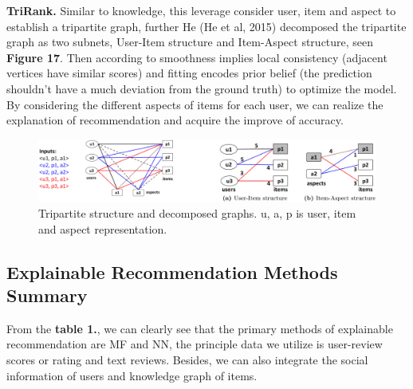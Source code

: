 \documentclass[10pt,twocolumn,letterpaper]{article}
\begin{document}
{\bf TriRank.} Similar to knowledge, this leverage consider user, item and aspect to establish a tripartite graph, further He (He et al, 2015) decomposed the tripartite graph as two subnets, User-Item structure and  Item-Aspect structure, seen {\bf Figure 17}. Then according to smoothness implies local consistency (adjacent vertices have similar scores) and fitting encodes prior belief (the prediction shouldn't have a much deviation from the ground truth) to optimize the model. By considering the different aspects of items for each user, we can realize the explanation of recommendation and acquire the improve of accuracy.  
\begin{figure}
	\begin{center}
		\includegraphics[width=0.9\linewidth]{TriRank.png}
	\end{center}
	\caption{Tripartite structure and decomposed graphs. u, a, p is user, item and aspect representation.}
	\label{fig:long}
	\label{fig:onecol}
\end{figure}

\subsection{Explainable Recommendation Methods Summary}
From the {\bf table 1.}, we can clearly see that the primary methods of explainable recommendation are MF and NN, the principle data we utilize is user-review scores or rating and text reviews. Besides, we can also integrate the social information of users and knowledge graph of items.
\end{document}
